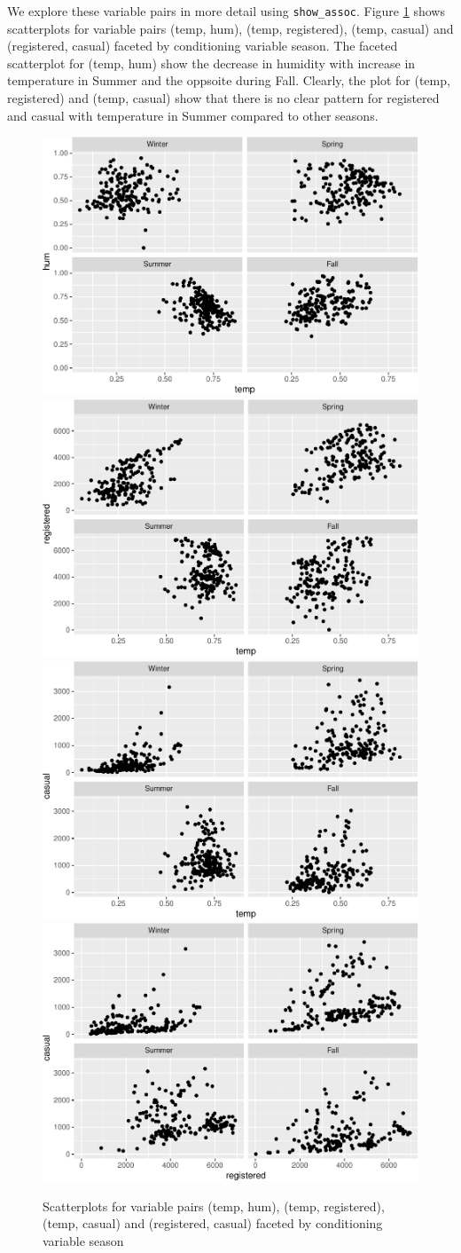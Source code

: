 We explore these variable pairs in more detail using
\texttt{show\_assoc}. Figure \ref{fig:int-pairs-conditional} shows
scatterplots for variable pairs (temp, hum), (temp, registered), (temp,
casual) and (registered, casual) faceted by conditioning variable
season. The faceted scatterplot for (temp, hum) show the decrease in
humidity with increase in temperature in Summer and the oppsoite during
Fall. Clearly, the plot for (temp, registered) and (temp, casual) show
that there is no clear pattern for registered and casual with
temperature in Summer compared to other seasons.

\begin{Schunk}
\begin{figure}
\includegraphics[width=0.5\linewidth]{rj_paper_files/figure-latex/int-pairs-conditional-1} \includegraphics[width=0.5\linewidth]{rj_paper_files/figure-latex/int-pairs-conditional-2} \includegraphics[width=0.5\linewidth]{rj_paper_files/figure-latex/int-pairs-conditional-3} \includegraphics[width=0.5\linewidth]{rj_paper_files/figure-latex/int-pairs-conditional-4} \caption[Scatterplots for variable pairs (temp, hum), (temp, registered), (temp, casual) and (registered, casual) faceted by conditioning variable season]{Scatterplots for variable pairs (temp, hum), (temp, registered), (temp, casual) and (registered, casual) faceted by conditioning variable season}\label{fig:int-pairs-conditional}

\end{figure}
\end{Schunk}
